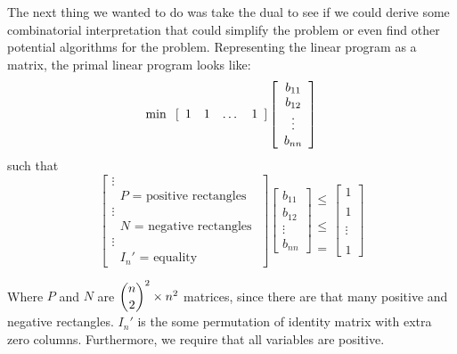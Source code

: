 \documentclass[11pt]{article}
\begin{document}
The next thing we wanted to do was take the dual to see if we could derive some combinatorial interpretation that could simplify the problem or even find other potential algorithms for the problem.
Representing the linear program as a matrix, the primal linear program looks like:
\[ \min \hspace{.1in} [ \begin{array}{cccc} 1 & 1 & \dots & 1 \end{array} ] \left[\begin{array}{c} b_{11} \\ b_{12} \\ \vdots \\ b_{nn} \end{array} \right]\]
such that
\[ \left[ \begin{array}{c} \vdots \\ \text{ $P$ = positive rectangles } \\ \vdots \\ \text{ $N$ = negative rectangles } \\ \vdots \\ \text{ $I_n'$ = equality } \end{array} \right] 
\left[\begin{array}{c} b_{11} \\ b_{12} \\ \vdots \\ b_{nn} \end{array} \right] 
\begin{array}{c} \\ \leq \\ \\ \\ \leq \\ \\ \\ = \end{array} 
\left[\begin{array}{c} 1 \\\\ 1 \\\\ \vdots \\\\ 1 \end{array} \right] \]

Where $P$ and $N$ are $\dbinom{n}{2}^2 \times n^2$ matrices, since there are that many positive and negative rectangles. $I_n'$ is the some permutation of identity matrix with extra zero columns. Furthermore, we require that all variables are positive. 
\end{document}
